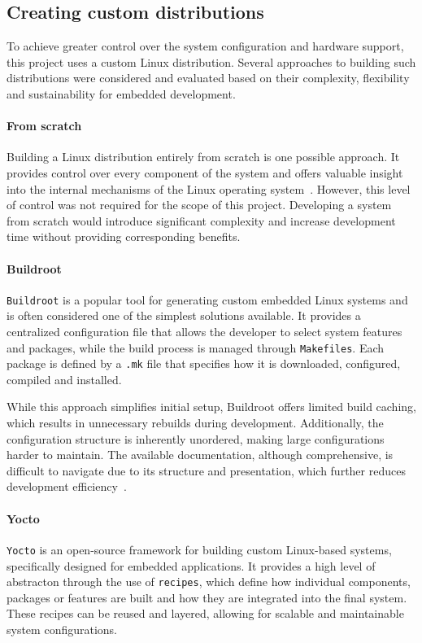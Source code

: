 \subsection{Creating custom distributions}

To achieve greater control over the system configuration and hardware support, this project uses
a custom Linux distribution. Several approaches to building such distributions were considered
and evaluated based on their complexity, flexibility and sustainability for embedded development.

\paragraph{From scratch}
Building a Linux distribution entirely from scratch is one possible approach.
It provides control over every component of the system and offers valuable insight into the internal
mechanisms of the Linux operating system~\cite{linux-from-scratch}. However, this level of control
was not required for the scope of this project. Developing a system from scratch would introduce
significant complexity and increase development time without providing corresponding benefits.

\paragraph{Buildroot}
\verb|Buildroot| is a popular tool for generating custom embedded Linux systems and is often considered
one of the simplest solutions available. It provides a centralized configuration file
that allows the developer to select system features and packages, while the build process is managed through \verb|Makefiles|.
Each package is defined by a \verb|.mk| file that specifies how it is downloaded, configured,
compiled and installed.

While this approach simplifies initial setup, Buildroot offers limited build caching, which results in
unnecessary rebuilds during development. Additionally, the configuration structure is
inherently unordered, making large configurations harder to maintain. The available
documentation, although comprehensive, is difficult to navigate due to its structure and presentation,
which further reduces development efficiency~\cite{buildroot-manual}.

\paragraph{Yocto}
\verb|Yocto| is an open-source framework for building custom Linux-based systems, specifically designed for
embedded applications. It provides a high level of abstracton through the use of \verb|recipes|,
which define how individual components, packages or features are built and how they are integrated
into the final system. These recipes can be reused and layered, allowing for scalable and maintainable
system configurations.

